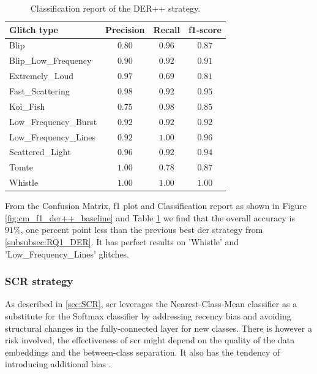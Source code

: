 \begin{table}[ht]
\centering
    \begin{tabular}{|l|c c c|}
    \hline
    \textbf{Glitch type} & \textbf{Precision} & \textbf{Recall} & \textbf{f1-score} \\ \hline
    Blip & $0.80$ & $0.96$ & $0.87$ \\
    Blip\_Low\_Frequency & $0.90$ & $0.92$ & $0.91$\\
    Extremely\_Loud & $0.97$ & $0.69$ &  $0.81$\\
    Fast\_Scattering & $0.98$ & $0.92$ &  $0.95$\\
    Koi\_Fish & $0.75$ & $0.98$ & $0.85$\\
    Low\_Frequency\_Burst & $0.92$ & $0.92$ & $0.92$\\
    Low\_Frequency\_Lines & $0.92$ & $1.00$ & $0.96$\\
    Scattered\_Light & $0.96$ & $0.92$ & $0.94$ \\
    Tomte & $1.00$ & $0.78$ & $0.87$ \\
    Whistle & $1.00$ & $1.00$ & $1.00$ \\
    \hline
    \end{tabular}
    \caption{Classification report of the DER++ strategy.}
    \label{tbl:RQ1_class_report_der++}
\end{table}

From the Confusion Matrix, f1 plot and Classification report as shown in Figure \ref{fig:cm_f1_der++_baseline} and Table \ref{tbl:RQ1_class_report_der++} we find that the overall accuracy is $91\%$, one percent point less than the previous best \acrshort{der} strategy from \ref{subsubsec:RQ1_DER}. It has perfect results on 'Whistle' and 'Low\_Frequency\_Lines' glitches. \\

\newpage
\subsubsection{SCR strategy}
As described in \ref{sec:SCR}, \acrshort{scr} leverages the Nearest-Class-Mean classifier as a substitute for the Softmax classifier by addressing recency bias and avoiding structural changes in the fully-connected layer for new classes. There is however a risk involved, the effectiveness of \acrshort{scr} might depend on the quality of the data embeddings and the between-class separation. It also has the tendency of introducing additional bias \citep{mai2021supervised, aleixo2023catastrophic}.   

